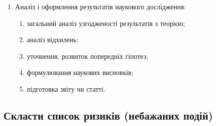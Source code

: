 \documentclass{mathreport}
\begin{document}
\begin{enumerate}[label=\arabic*.]
    \item Аналіз і оформлення результатів наукового дослідження:
    \begin{enumerate}[label=\arabic{enumi}.\arabic{enumii}]
        \item загальний аналіз узгодженості результатів з теорією;
        \item аналіз відхилень;
        \item уточнення, розвиток попередніх гіпотез;
        \item формулювання наукових висновків;
        \item підготовка звіту чи статті.
    \end{enumerate}
\end{enumerate}

\subsection{Скласти список ризиків (небажаних подій)}
\end{document}
